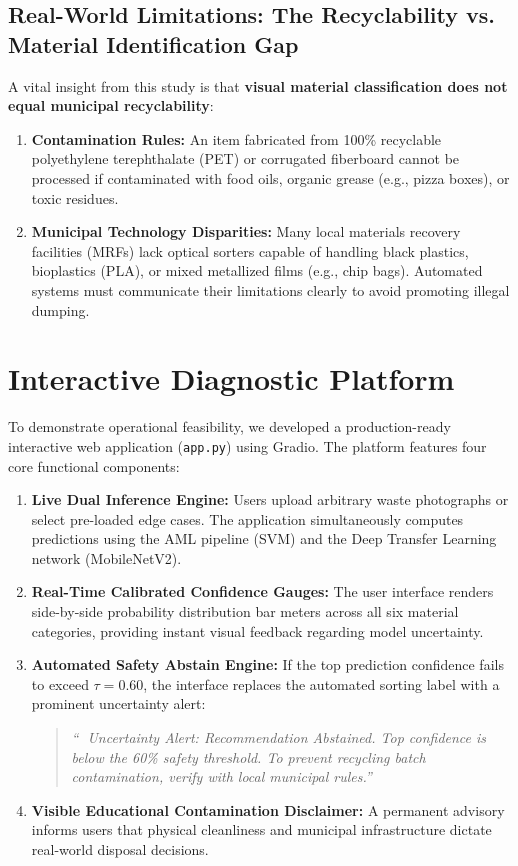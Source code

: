 \documentclass[11pt,a4paper]{article}
\begin{document}
\subsection{Real-World Limitations: The Recyclability vs. Material Identification Gap}
A vital insight from this study is that \textbf{visual material classification does not equal municipal recyclability}:
\begin{enumerate}[label=\arabic*.]
    \item \textbf{Contamination Rules:} An item fabricated from 100\% recyclable polyethylene terephthalate (PET) or corrugated fiberboard cannot be processed if contaminated with food oils, organic grease (e.g., pizza boxes), or toxic residues.
    \item \textbf{Municipal Technology Disparities:} Many local materials recovery facilities (MRFs) lack optical sorters capable of handling black plastics, bioplastics (PLA), or mixed metallized films (e.g., chip bags). Automated systems must communicate their limitations clearly to avoid promoting illegal dumping.
\end{enumerate}

\section{Interactive Diagnostic Platform}
To demonstrate operational feasibility, we developed a production-ready interactive web application (\texttt{app.py}) using Gradio. The platform features four core functional components:
\begin{enumerate}[label=\arabic*.]
    \item \textbf{Live Dual Inference Engine:} Users upload arbitrary waste photographs or select pre-loaded edge cases. The application simultaneously computes predictions using the AML pipeline (SVM) and the Deep Transfer Learning network (MobileNetV2).
    \item \textbf{Real-Time Calibrated Confidence Gauges:} The user interface renders side-by-side probability distribution bar meters across all six material categories, providing instant visual feedback regarding model uncertainty.
    \item \textbf{Automated Safety Abstain Engine:} If the top prediction confidence fails to exceed $\tau = 0.60$, the interface replaces the automated sorting label with a prominent uncertainty alert:
    \begin{quote}
        \textit{``🛑 Uncertainty Alert: Recommendation Abstained. Top confidence is below the 60\% safety threshold. To prevent recycling batch contamination, verify with local municipal rules.''}
    \end{quote}
    \item \textbf{Visible Educational Contamination Disclaimer:} A permanent advisory informs users that physical cleanliness and municipal infrastructure dictate real-world disposal decisions.
\end{enumerate}
\end{document}
